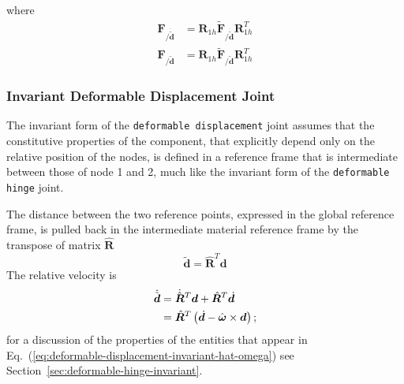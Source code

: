 \documentclass[10pt,fleqn,subeqn]{report}
\newcommand{\T}[1]{\bm{#1}}
\newcommand{\TT}[1]{\bm{#1}}
\begin{document}
where 
\begin{subequations}
\begin{align}
	\T{F}_{/\dot{\tilde{\T{d}}}} &= \T{R}_{1h} \tilde{\T{F}}_{/\dot{\tilde{\T{d}}}} \T{R}_{1h}^T \\
	\T{F}_{/\tilde{\T{d}}} &= \T{R}_{1h} \tilde{\T{F}}_{/\tilde{\T{d}}} \T{R}_{1h}^T
\end{align}
\end{subequations}



\subsubsection{Invariant Deformable Displacement Joint}
The invariant form of the \texttt{deformable displacement} joint
assumes that the constitutive properties of the component,
that explicitly depend only on the relative position 
of the nodes, is defined in a reference frame that is intermediate
between those of node 1 and 2, much like the invariant form
of the \texttt{deformable hinge} joint.

The distance between the two reference points, expressed
in the global reference frame, is pulled back in the 
intermediate material reference frame by the transpose
of matrix $\hat{\TT{R}}$
\begin{equation}
	\tilde{\T{d}} = \hat{\TT{R}}^T \T{d}
\end{equation}
The relative velocity is
\begin{align}
	\dot{\tilde{\T{d}}}
	&= \dot{\hat{\TT{R}}}^T \T{d} + \hat{\TT{R}}^T \dot{\T{d}}
		\nonumber \\
	&= \hat{\TT{R}}^T \plbr{
		\dot{\T{d}} - \hat{\T{\omega}} \times \T{d}
	} ;
\end{align}
for a discussion of the properties of the entities
that appear in Eq.~(\ref{eq:deformable-displacement-invariant-hat-omega})
see Section~\ref{sec:deformable-hinge-invariant}.
\end{document}
